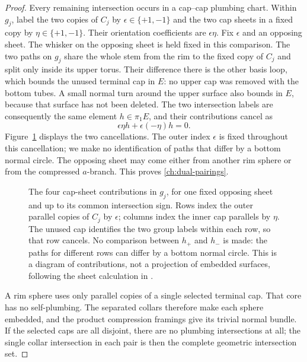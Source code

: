 \begin{proof}
Every remaining intersection occurs in a cap--cap plumbing chart.
Within $g_j$, label the two copies of $C_j$ by
$\epsilon\in\{+1,-1\}$ and the two cap sheets in a fixed copy
by $\eta\in\{+1,-1\}$.  Their orientation coefficients are
$\epsilon\eta$.  Fix $\epsilon$ and an opposing sheet.  The
whisker on the opposing sheet is held fixed in this comparison.
The two paths on $g_j$ share the whole stem from the rim to the
fixed copy of $C_j$ and split only inside its upper torus.  Their
difference there is the other basis loop, which bounds the
unused terminal cap in $E$: no upper cap was removed with the
bottom tubes.  A small normal turn around the upper surface
also bounds in $E$, because that surface has not been deleted.
The two intersection labels are consequently the same element
$h\in\pi_1E$, and their contributions cancel as
\[
 \epsilon\eta h+\epsilon(-\eta)h=0.
\]
Figure~\ref{ch:sheet-cancellation} displays the two cancellations.
The outer index $\epsilon$ is fixed throughout this cancellation;
we make no identification of paths that differ by a bottom
normal circle.  The opposing sheet may come either from another
rim sphere or from the compressed $a$-branch.  This proves
\eqref{ch:dual-pairings}.

\begin{figure}[ht]
\centering
{}
\caption{The four cap-sheet contributions in $g_j$, for one fixed
opposing sheet and up to its common intersection sign.  Rows index
the outer parallel copies of $C_j$ by $\epsilon$; columns index the
inner cap parallels by $\eta$.  The unused cap identifies the two
group labels within each row, so that row cancels.  No comparison
between $h_+$ and $h_-$ is made: the paths for different rows can
differ by a bottom normal circle.  This is a diagram of contributions,
not a projection of embedded surfaces, following the sheet calculation
in \cite[Lemma~2.4]{MT}.}
\label{ch:sheet-cancellation}
\end{figure}

A rim sphere uses only parallel copies of a single selected
terminal cap.  That core has no self-plumbing.  The separated
collars therefore make each sphere embedded, and the product
compression framings give its trivial normal bundle.  If the
selected caps are all disjoint, there are no plumbing
intersections at all; the single collar intersection in each
pair is then the complete geometric intersection set.
\end{proof}

